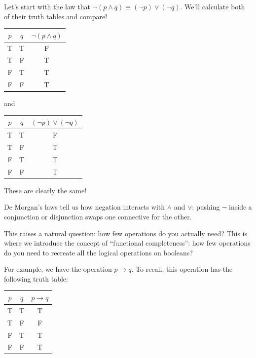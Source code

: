 \documentclass[11pt]{article}
\begin{document}
Let's start with the law that $\lnot(p \wedge q) \equiv (\lnot p) \vee (\lnot q)$. We'll calculate both of their truth tables and compare!

\begin{center}
\begin{tabular}{cc|c}
\toprule
$p$ & $q$ & $\lnot(p \wedge q)$ \\
\midrule
T & T & F \\
T & F & T \\
F & T & T \\
F & F & T \\
\bottomrule
\end{tabular}
\end{center}

and

\begin{center}
\begin{tabular}{cc|c}
\toprule
$p$ & $q$ & $(\lnot p) \vee (\lnot q)$ \\
\midrule
T & T & F \\
T & F & T \\
F & T & T \\
F & F & T \\
\bottomrule
\end{tabular}
\end{center}

These are clearly the same!

De Morgan's laws tell us how negation interacts with $\wedge$ and $\vee$: pushing $\lnot$ inside a conjunction or disjunction swaps one connective for the other.

This raises a natural question: how few operations do you actually need? This is where we introduce the concept of ``functional completeness'': how few operations do you need to recreate all the logical operations on booleans?

For example, we have the operation $p \to q$. To recall, this operation has the following truth table:

\begin{center}
\begin{tabular}{cc|c}
\toprule
$p$ & $q$ & $p \to q$ \\
\midrule
T & T & T \\
T & F & F \\
F & T & T \\
F & F & T \\
\bottomrule
\end{tabular}
\end{center}
\end{document}
